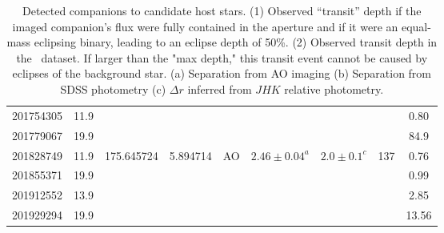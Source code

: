 \begin{landscape}
\begin{table}[hbt!]
\begin{center}
\begin{tabular}{lcccccccc}
 201754305  & 11.9 &                  &                       &                &                                                           &                          &            & 0.80  \\
 201779067  & 19.9 &                  &                       &                &                                                           &                          &            & 84.9  \\
 201828749  & 11.9 & 175.645724  &  5.894714  &   AO  &        $2.46 \pm 0.04^a$   & $ 2.0 \pm 0.1^c$ & 137 & 0.76  \\
 201855371  & 19.9 &                  &                       &                &                                                           &                          &            & 0.99   \\
 201912552  & 13.9 &                 &                       &                &                                                           &                          &             & 2.85   \\
 201929294  & 19.9 &                  &                       &                &                                                           &                          &            & 13.56 \\
\hline
\end{tabular}
\caption[Detected companions to candidate host stars]{Detected companions to candidate host stars.
(1) Observed ``transit'' depth if the imaged companion's flux were fully contained in the aperture and
if it were an equal-mass eclipsing binary, leading to an eclipse depth of 50\%. (2) Observed transit depth in the \KT\ dataset. If larger than the "max depth," this transit event cannot
be caused by eclipses of the background star.
(a) Separation from AO imaging
(b) Separation from SDSS photometry
(c) $\Delta r$ inferred from $JHK$ relative photometry.}
\end{center}
\label{Tab:bg}
\end{table}
\end{landscape}
\clearpage